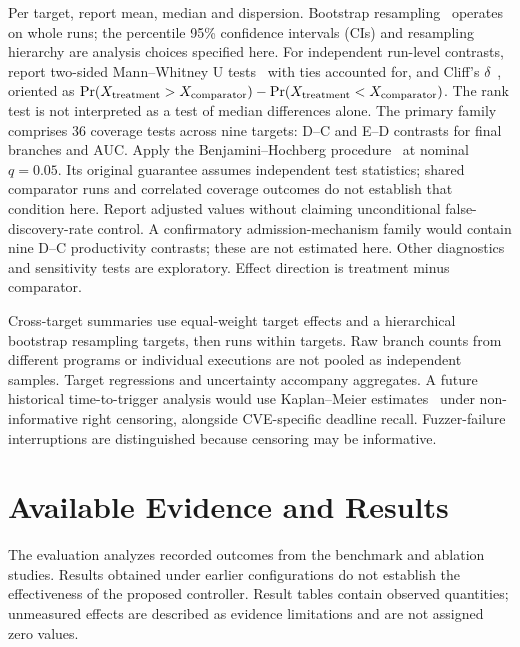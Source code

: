 \documentclass[final,5p,times,number]{elsarticle}
\begin{document}
Per target, report mean, median and dispersion. Bootstrap resampling~\cite{efron1979} operates on whole runs; the percentile 95\% confidence intervals (CIs) and resampling hierarchy are analysis choices specified here. For independent run-level contrasts, report two-sided Mann--Whitney U tests~\cite{mann1947} with ties accounted for, and Cliff's $\delta$~\cite{cliff1993}, oriented as $\Pr(X_{\rm treatment}>X_{\rm comparator})-\Pr(X_{\rm treatment}<X_{\rm comparator})$. The rank test is not interpreted as a test of median differences alone. The primary family comprises 36 coverage tests across nine targets: D--C and E--D contrasts for final branches and AUC. Apply the Benjamini--Hochberg procedure~\cite{benjamini1995} at nominal $q=0.05$. Its original guarantee assumes independent test statistics; shared comparator runs and correlated coverage outcomes do not establish that condition here. Report adjusted values without claiming unconditional false-discovery-rate control. A confirmatory admission-mechanism family would contain nine D--C productivity contrasts; these are not estimated here. Other diagnostics and sensitivity tests are exploratory. Effect direction is treatment minus comparator.

Cross-target summaries use equal-weight target effects and a hierarchical bootstrap resampling targets, then runs within targets. Raw branch counts from different programs or individual executions are not pooled as independent samples. Target regressions and uncertainty accompany aggregates. A future historical time-to-trigger analysis would use Kaplan--Meier estimates~\cite{kaplan1958} under non-informative right censoring, alongside CVE-specific deadline recall. Fuzzer-failure interruptions are distinguished because censoring may be informative.


\section{Available Evidence and Results}
\label{sec:results}
The evaluation analyzes recorded outcomes from the benchmark and ablation studies. Results obtained under earlier configurations do not establish the effectiveness of the proposed controller. Result tables contain observed quantities; unmeasured effects are described as evidence limitations and are not assigned zero values.
\end{document}
